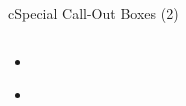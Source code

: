 \begin{myslide}{c}{Special Call-Out Boxes (2)}

\begin{columns}

\begin{column}{1\textwidth}

\begin{itemize}[<+->]

\itembox
\begin{myremark}
\lipsum[1][1]
\end{myremark}

\item \lipsum[1][6]%

\itembox
\begin{myquestion}
\lipsum[1][1]
\end{myquestion}

\itembox
\begin{myremark}
\lipsum[1][1]
\end{myremark}

\item \lipsum[1][6]

\end{itemize}

\end{column}

\end{columns}

\end{myslide}